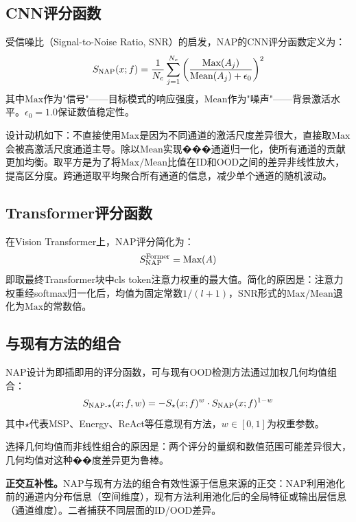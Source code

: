 \subsection{CNN评分函数}

受信噪比（Signal-to-Noise Ratio, SNR）的启发，NAP的CNN评分函数定义为：
\begin{equation}\label{eq:nap-cnn}
  S_{\text{NAP}}(x; f) = \frac{1}{N_c}\sum_{j=1}^{N_c}\left(\frac{\text{Max}(A_j)}{\text{Mean}(A_j) + \epsilon_0}\right)^2
\end{equation}
其中$\text{Max}$作为"信号"——目标模式的响应强度，$\text{Mean}$作为"噪声"——背景激活水平。$\epsilon_0 = 1.0$保证数值稳定性。

设计动机如下：不直接使用$\text{Max}$是因为不同通道的激活尺度差异很大，直接取$\text{Max}$会被高激活尺度通道主导。除以$\text{Mean}$实现���通道归一化，使所有通道的贡献更加均衡。取平方是为了将$\text{Max}/\text{Mean}$比值在ID和OOD之间的差异非线性放大，提高区分度。跨通道取平均聚合所有通道的信息，减少单个通道的随机波动。

\subsection{Transformer评分函数}

在Vision Transformer上，NAP评分简化为：
\begin{equation}\label{eq:nap-transformer}
  S_{\text{NAP}}^{\text{Former}} = \text{Max}(A)
\end{equation}
即取最终Transformer块中cls token注意力权重的最大值。简化的原因是：注意力权重经softmax归一化后，均值为固定常数$1/(l+1)$，SNR形式的$\text{Max}/\text{Mean}$退化为$\text{Max}$的常数倍。

\subsection{与现有方法的组合}

NAP设计为即插即用的评分函数，可与现有OOD检测方法通过加权几何均值组合：
\begin{equation}\label{eq:nap-combination}
  S_{\text{NAP-}\star}(x; f, w) = -S_{\star}(x; f)^w \cdot S_{\text{NAP}}(x; f)^{1-w}
\end{equation}
其中$\star$代表MSP、Energy、ReAct等任意现有方法，$w \in [0,1]$为权重参数。

选择几何均值而非线性组合的原因是：两个评分的量纲和数值范围可能差异很大，几何均值对这种��度差异更为鲁棒。

\textbf{正交互补性。}NAP与现有方法的组合有效性源于信息来源的正交：NAP利用池化前的通道内分布信息（空间维度），现有方法利用池化后的全局特征或输出层信息（通道维度）。二者捕获不同层面的ID/OOD差异。%

